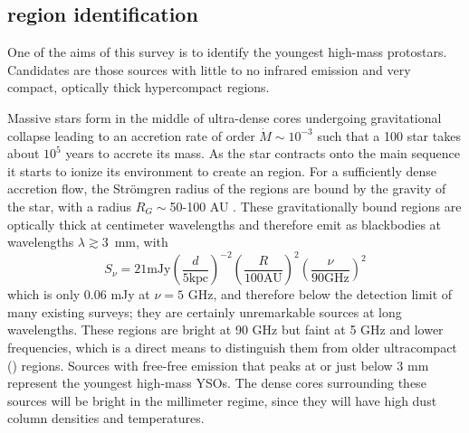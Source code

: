 \documentclass[twocolumn]{aastex62}
\begin{document}


\subsection{\hchii region identification}
\label{sec:hiireg}
One of the aims of this survey is to identify the youngest high-mass
protostars.  Candidates are those sources with little to no infrared emission
and very compact, optically thick hypercompact \hii regions.

Massive stars form in the middle of ultra-dense cores undergoing gravitational
collapse leading to an accretion rate of order $\dot{M} \sim 10^{-3}$ \msun
\peryr such that a 100 \msun star takes about $10^5$ years to accrete its mass.
As the star contracts onto the main sequence it starts to ionize its
environment to create an \hchii region.  For a sufficiently dense accretion
flow, the Strömgren radius of the \hchii regions are bound by the gravity of
the star, with a radius $R_G \sim$50-100 AU
\citep{Keto2002a,Keto2003a,Keto2007a}.  These gravitationally bound \hchii
regions are optically thick at centimeter wavelengths and therefore emit as
blackbodies at wavelengths $\lambda\gtrsim$3~mm, with 
\begin{equation}
    S_\nu=21 \textrm{mJy} \left(\frac{d}{5
    \textrm{kpc}}\right)^{-2} \left(\frac{R}{100 \textrm{AU}}\right)^2 \left(\frac{\nu}{90 \textrm{GHz}}\right)^2
\end{equation}
which is only
0.06 mJy at $\nu=5$ GHz, and therefore below the detection limit of many
existing surveys; they are certainly unremarkable sources at long wavelengths.
These \hchii regions are bright at 90 GHz but faint at 5 GHz and lower
frequencies, which is a direct means to distinguish them from older
ultracompact (\uchii) regions.  Sources
with free-free emission that peaks at or just below 3 mm represent the youngest
high-mass YSOs.  The dense cores surrounding these sources will be bright
in the millimeter regime, since they will have high dust column densities and
temperatures.
\end{document}
